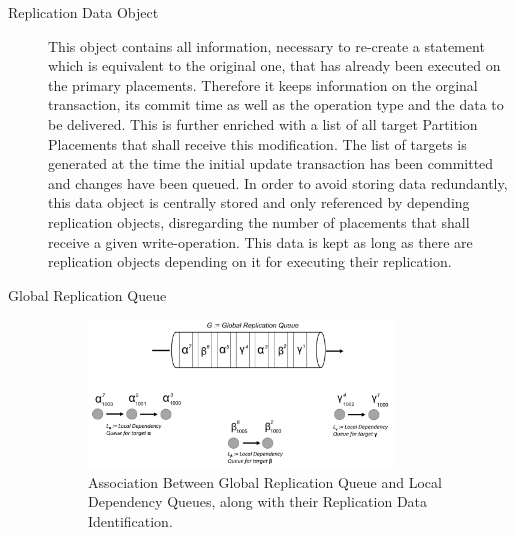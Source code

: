 \begin{description}

    \item[Replication Data Object] This object contains all information, necessary to re-create a statement which is equivalent to the original one,
    that has already been executed on the primary placements. 
    Therefore it keeps information on the orginal transaction, its commit time as well as the operation type and the data to be delivered. 
    This is further enriched with a list of all target Partition Placements that shall receive this modification. The list of targets is generated
    at the time the initial update transaction has been committed and changes have been queued. In order to avoid storing data redundantly, this data object 
    is centrally stored and only referenced by depending replication objects, disregarding the number of placements that shall receive a given write-operation.
    This data is kept as long as there are replication objects depending on it for executing their replication.


    \item[Global Replication Queue] 
    
    \begin{figure}[t]
        \centering
        \includegraphics[width=0.8\textwidth]{Figures/Queue.png}
        \caption{Association Between Global Replication Queue and Local Dependency Queues, along with their Replication Data Identification.}
        \label{fig:queue}
    \end{figure}
  

\end{description}
